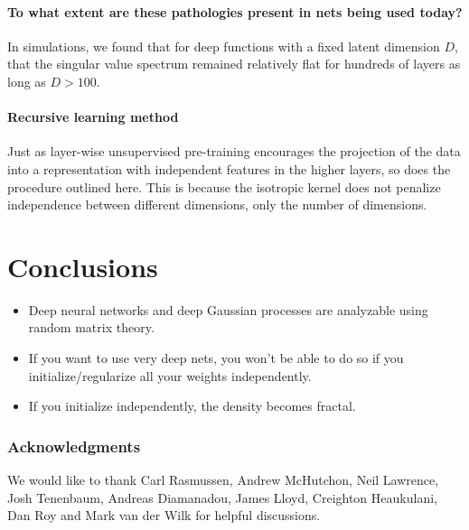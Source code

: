 \documentclass{article}
\begin{document}
\paragraph{To what extent are these pathologies present in nets being used today?}  In simulations, we found that for deep functions with a fixed latent dimension $D$, that the singular value spectrum remained relatively flat for hundreds of layers as long as $D > 100$.




\paragraph{Recursive learning method}

Just as layer-wise unsupervised pre-training encourages the projection of the data into a representation with independent features in the higher layers, so does the procedure outlined here.  This is because the isotropic kernel does not penalize independence between different dimensions, only the number of dimensions.




\section{Conclusions}

\begin{itemize}
\item Deep neural networks and deep Gaussian processes are analyzable using random matrix theory.
\item If you want to use very deep nets, you won't be able to do so if you initialize/regularize all your weights independently.
\item If you initialize independently, the density becomes fractal.
\end{itemize}


\subsubsection*{Acknowledgments}

We would like to thank Carl Rasmussen, Andrew McHutchon, Neil Lawrence, Josh Tenenbaum, Andreas Diamanadou, James Lloyd, Creighton Heaukulani, Dan Roy and Mark van der Wilk for helpful discussions.



\end{document}
